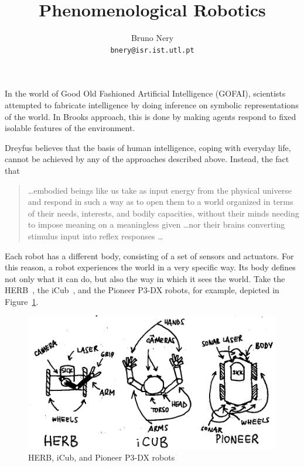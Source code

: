 \documentclass{article}
\title{Phenomenological Robotics}
\author{Bruno Nery\\
        \texttt{bnery@isr.ist.utl.pt}}
\begin{document}
\maketitle

In the world of Good Old Fashioned Artificial Intelligence (GOFAI), scientists
attempted to fabricate intelligence by doing inference on symbolic
representations of the world. In Brooks \cite{brooks91} approach, this is done
by making agents respond to fixed isolable features of the environment.

Dreyfus \cite{dreyfus07} believes that the basis of human intelligence, coping
with everyday life, cannot be achieved by any of the approaches described above.
Instead, the fact that

\begin{quotation}
  \dots embodied beings like us take as input energy from the physical universe
  and respond in such a way as to open them to a world organized in terms of
  their needs, interests, and bodily capacities, without their minds needing to
  impose meaning on a meaningless given \dots nor their brains converting
  stimulus input into reflex responses \dots
\end{quotation}


Each robot has a different body, consisting of a set of sensors and actuators. 
For this reason, a robot experiences the world in a very specific way. Its body
defines not only what it can do, but also the way in which it sees the world.
Take the HERB~\cite{srinivasa2009herb}, the iCub~\cite{metta2010icub}, and the
Pioneer P3-DX robots, for example, depicted in
Figure~\ref{fig:herb_icub_pioneer}.

\begin{figure}[h]
  \centering
  \includegraphics{figures/herb_icub_pioneer.png}
  \caption{HERB, iCub, and Pioneer P3-DX robots}
  \label{fig:herb_icub_pioneer}
\end{figure}
\end{document}

